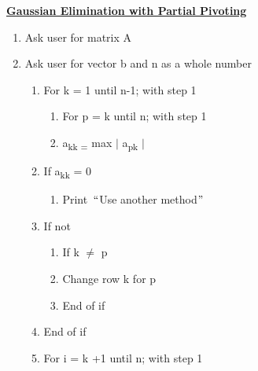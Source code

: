 \documentclass[12pt]{article}
\renewcommand{\_}{\kern-1.5pt\textunderscore\kern-1.5pt}
\begin{document}
\textbf{\uline{Gaussian Elimination with Partial Pivoting}}\par


\vspace{\baselineskip}
\begin{enumerate}
	\item Ask user for matrix A \par

	\item Ask user for vector b and n as a whole number\par

\begin{enumerate}
	\item For k = 1 until n-1; with step 1\par

\begin{enumerate}
	\item For p = k until n; with step 1\par

	\item a\textsubscript{kk = }max $ \vert $ a\textsubscript{pk} $  \vert $ \par


\end{enumerate}
	\item If a\textsubscript{kk} = 0 \par

\begin{enumerate}
	\item Print\  $``$Use another method$"$ \par


\end{enumerate}
	\item If not \par

\begin{enumerate}
	\item If k $ \neq $  p \par

	\item Change row k for p\par

	\item End of if\par


\end{enumerate}
	\item End of if\par

	\item For i = k +1 until n; with step 1 \par


\end{enumerate}
\end{enumerate}
\end{document}
